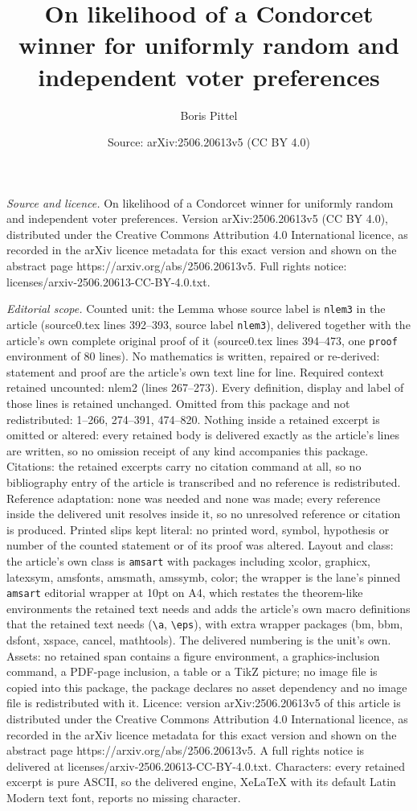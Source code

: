 \documentclass[10pt,a4paper]{amsart}
\title[On likelihood of a Condorcet winner for uniformly random and]{On likelihood of a Condorcet winner for uniformly random and independent voter preferences}
\author{Boris Pittel}
\date{Source: arXiv:2506.20613v5 (CC BY 4.0)}
\begin{document}
\maketitle

\noindent\emph{Source and licence.} On likelihood of a Condorcet winner for uniformly random and independent voter preferences. Version arXiv:2506.20613v5 (CC BY 4.0), distributed under the Creative Commons Attribution 4.0 International licence, as recorded in the arXiv licence metadata for this exact version and shown on the abstract page https://arxiv.org/abs/2506.20613v5. Full rights notice: licenses/arxiv-2506.20613-CC-BY-4.0.txt.\par\smallskip

\noindent\textit{Editorial scope.} Counted unit: the Lemma whose source label is \texttt{nlem3} in the article (source0.tex lines 392--393, source label \texttt{nlem3}), delivered together with the article's own complete original proof of it (source0.tex lines 394--473, one \texttt{proof} environment of 80 lines). No mathematics is written, repaired or re-derived: statement and proof are the article's own text line for line. Required context retained uncounted: nlem2 (lines 267--273). Every definition, display and label of those lines is retained unchanged. Omitted from this package and not redistributed: 1--266, 274--391, 474--820. Nothing inside a retained excerpt is omitted or altered: every retained body is delivered exactly as the article's lines are written, so no omission receipt of any kind accompanies this package. Citations: the retained excerpts carry no citation command at all, so no bibliography entry of the article is transcribed and no reference is redistributed. Reference adaptation: none was needed and none was made; every reference inside the delivered unit resolves inside it, so no unresolved reference or citation is produced. Printed slips kept literal: no printed word, symbol, hypothesis or number of the counted statement or of its proof was altered. Layout and class: the article's own class is \texttt{amsart} with packages including xcolor, graphicx, latexsym, amsfonts, amsmath, amssymb, color; the wrapper is the lane's pinned \texttt{amsart} editorial wrapper at 10pt on A4, which restates the theorem-like environments the retained text needs and adds the article's own macro definitions that the retained text needs (\texttt{\textbackslash a}, \texttt{\textbackslash eps}), with extra wrapper packages (bm, bbm, dsfont, xspace, cancel, mathtools). The delivered numbering is the unit's own. Assets: no retained span contains a figure environment, a graphics-inclusion command, a PDF-page inclusion, a table or a TikZ picture; no image file is copied into this package, the package declares no asset dependency and no image file is redistributed with it. Licence: version arXiv:2506.20613v5 of this article is distributed under the Creative Commons Attribution 4.0 International licence, as recorded in the arXiv licence metadata for this exact version and shown on the abstract page https://arxiv.org/abs/2506.20613v5. A full rights notice is delivered at licenses/arxiv-2506.20613-CC-BY-4.0.txt. Characters: every retained excerpt is pure ASCII, so the delivered engine, XeLaTeX with its default Latin Modern text font, reports no missing character.
\end{document}
